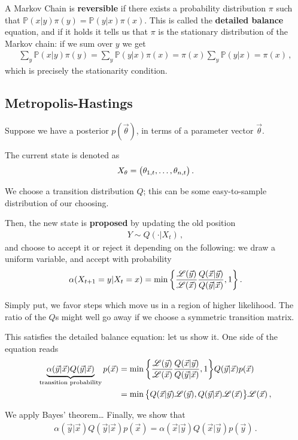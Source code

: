 \documentclass[main.tex]{subfiles}
\begin{document}
A Markov Chain is \textbf{reversible} if there exists a probability distribution \(\pi \) such that \(\mathbb{P}(x | y) \pi (y) = \mathbb{P}(y | x) \pi (x)\). 
This is called the \textbf{detailed balance} equation, and if it holds it tells us that \(\pi \) is the stationary distribution of the Markov chain: if we sum over \(y\) we get 
%
\begin{align}
\sum _{y} \mathbb{P}(x | y) \pi (y) = \sum _{y} \mathbb{P}(y | x) \pi (x) 
= \pi (x) \sum _{y} \mathbb{P}(y | x ) = \pi (x)
\,,
\end{align}
%
which is precisely the stationarity condition.

\subsection{Metropolis-Hastings} 

Suppose we have a posterior \(p(\vec{\theta})\), in terms of a parameter vector \(\vec{\theta}\). 

The current state is denoted as
%
\begin{align}
X_\theta = \qty(\theta_{1, t },  \dots, \theta_{n, t})
\,.
\end{align}

We choose a transition distribution \(Q\);
this can be some easy-to-sample distribution of our choosing. 

Then, the new state is \textbf{proposed} by updating the old position
%
\begin{align}
Y \sim Q ( \cdot | X_t)
\,,
\end{align}
%
and choose to accept it or reject it depending on the following: we draw a uniform variable, and accept with probability 
%
\begin{align}
\alpha (X_{t+1} = y | X_t = x) = 
\min \qty{ \frac{\mathscr{L}(\vec{y})}{\mathscr{L}(\vec{x})} \frac{Q(\vec{x} | \vec{y})}{Q(\vec{y} | \vec{x})}, 1}
\,.
\end{align}

Simply put, we favor steps which move us in a region of higher likelihood. 
The ratio of the \(Q\)s might well go away if we choose a symmetric transition matrix. 

This satisfies the detailed balance equation: let us show it. 
One side of the equation reads
%
\begin{align}
\underbrace{\alpha (\vec{y} | \vec{x}) Q (\vec{y} | \vec{x})}_{\text{transition probability}} p(\vec{x})
&= \min \qty{\frac{\mathscr{L}(\vec{y})}{\mathscr{L}(\vec{x})} 
\frac{Q(\vec{x} | \vec{y})}{Q(\vec{y} | \vec{x})}, 1} Q(\vec{y} | \vec{x}) p(\vec{x})  \\
&= \min \qty{Q(\vec{x} | \vec{y}) \mathscr{L}(\vec{y}), Q(\vec{y} | \vec{x}) \mathscr{L}(\vec{x})} \mathscr{L} (\vec{x} ) 
\,,
\end{align}
%

We apply Bayes' theorem\dots
Finally, we show that 
%
\begin{align}
\alpha (\vec{y} | \vec{x}) Q (\vec{y} | \vec{x}) p(\vec{x}) 
= \alpha (\vec{x} | \vec{y}) Q(\vec{x} | \vec{y}) p(\vec{y})
\,.
\end{align}
\end{document}
